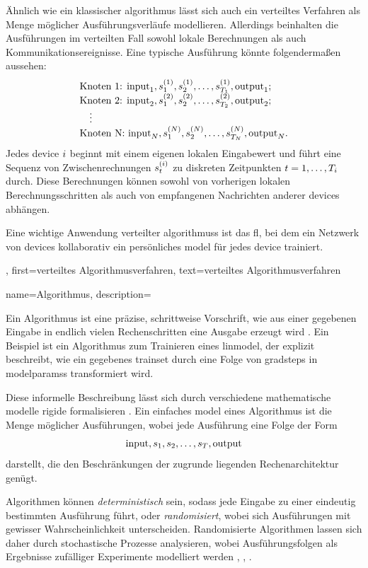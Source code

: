 {{{{{{		Ähnlich wie ein klassischer \gls{algorithmus} lässt sich auch ein verteiltes Verfahren als 
		Menge möglicher Ausführungsverläufe modellieren. Allerdings beinhalten die Ausführungen im 
		verteilten Fall sowohl lokale Berechnungen als auch Kommunikationsereignisse. 
		Eine typische Ausführung könnte folgendermaßen aussehen:
		\[
		\begin{array}{l}
			\text{Knoten 1: } {\rm input}_1, s_1^{(1)}, s_2^{(1)}, \ldots, s_{T_1}^{(1)}, {\rm output}_1; \\
			\text{Knoten 2: } {\rm input}_2, s_1^{(2)}, s_2^{(2)}, \ldots, s_{T_2}^{(2)}, {\rm output}_2; \\
			\quad \vdots \\
			\text{Knoten N: } {\rm input}_N, s_1^{(N)}, s_2^{(N)}, \ldots, s_{T_N}^{(N)}, {\rm output}_N.
		\end{array}
		\]
		Jedes \gls{device} $i$ beginnt mit einem eigenen lokalen Eingabewert und führt eine Sequenz 
		von Zwischenrechnungen $s_{t}^{(i)}$ zu diskreten Zeitpunkten $t = 1, \dots, T_i$ durch. 
		Diese Berechnungen können sowohl von vorherigen lokalen Berechnungsschritten als auch von empfangenen 
		Nachrichten anderer \gls{device}s abhängen. 
		
		Eine wichtige Anwendung verteilter \glspl{algorithmus} ist das \gls{fl}, bei dem ein Netzwerk 
		von \glspl{device} kollaborativ ein persönliches \gls{model} für jedes \gls{device} trainiert.},
	first={verteiltes Algorithmusverfahren}, text={verteiltes Algorithmusverfahren}
}

{name={Algorithmus},
	description={Ein Algorithmus ist eine präzise, schrittweise Vorschrift, 
		wie aus einer gegebenen Eingabe in endlich vielen Rechenschritten eine Ausgabe erzeugt wird \cite{Cormen:2022aa}. 
		Ein Beispiel ist ein Algorithmus zum Trainieren eines \gls{linmodel}, der explizit beschreibt, 
		wie ein gegebenes \gls{trainset} durch eine Folge von \glspl{gradstep} in \glspl{modelparams} 
		transformiert wird. 
		
		Diese informelle Beschreibung lässt sich durch verschiedene mathematische \gls{model}le 
		rigide formalisieren \cite{Sipser2013}. Ein einfaches \gls{model} eines Algorithmus ist 
		die Menge möglicher Ausführungen, wobei jede Ausführung eine Folge der Form
		$${\rm input},s_1,s_2,\ldots,s_T,{\rm output}$$
		darstellt, die den Beschränkungen der zugrunde liegenden Rechenarchitektur genügt.
		
		Algorithmen können \emph{deterministisch} sein, sodass jede Eingabe zu einer eindeutig bestimmten 
		Ausführung führt, oder \emph{randomisiert}, wobei sich Ausführungen mit gewisser Wahrscheinlichkeit 
		unterscheiden. Randomisierte Algorithmen lassen sich daher durch stochastische Prozesse analysieren, 
		wobei Ausführungsfolgen als Ergebnisse zufälliger Experimente modelliert werden 
		\cite{BertsekasProb}, \cite{RandomizedAlgos}, \cite{Gallager13}.
		
}}}}}}
